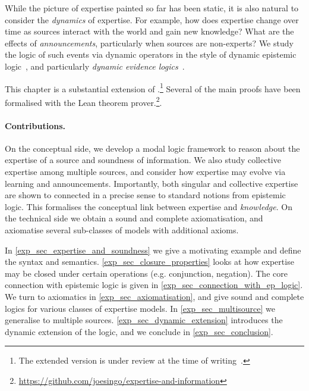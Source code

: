 While the picture of expertise painted so far has been static, it is also
natural to consider the \emph{dynamics} of expertise. For example, how does
expertise change over time as sources interact with the world and gain new
knowledge? What are the effects of \emph{announcements}, particularly when
sources are non-experts? We study the logic of such events via dynamic
operators in the style of dynamic epistemic
logic~\cite{van_Ditmarsch_2008}, and particularly \emph{dynamic evidence
logics}~\cite{van2011dynamic,vanbenthem2014106}.

This chapter is a substantial extension of
\textcite{singleton2021logic}.\footnote{The extended version is under review at
the time of writing~\cite{singleton2022expetise}.} Several of the main proofs
have been formalised with the Lean theorem
prover.\footnote{\url{https://github.com/joesingo/expertise-and-information}}.

\paragraph{Contributions.} On the conceptual side, we develop a modal logic
framework to reason about the expertise of a source and soundness of
information. We also study collective expertise among multiple sources, and
consider how expertise may evolve via learning and announcements. Importantly,
both singular and collective expertise are shown to connected in a precise
sense to standard notions from epistemic logic. This formalises the conceptual
link between expertise and \emph{knowledge}.
%
On the technical side we obtain a sound and complete axiomatisation, and
axiomatise several sub-classes of models with additional axioms.

\begin{chapteroutline}
    In \cref{exp_sec_expertise_and_soundness} we give a motivating example and
    define the syntax and semantics.  \cref{exp_sec_closure_properties} looks
    at how expertise may be closed under certain operations (e.g. conjunction,
    negation). The core connection with epistemic logic is given in
    \cref{exp_sec_connection_with_ep_logic}. We turn to axiomatics in
    \cref{exp_sec_axiomatisation}, and give sound and complete logics for
    various classes of expertise models. In \cref{exp_sec_multisource} we
    generalise to multiple sources. \cref{exp_sec_dynamic_extension} introduces
    the dynamic extension of the logic, and we conclude in
    \cref{exp_sec_conclusion}.
\end{chapteroutline}

